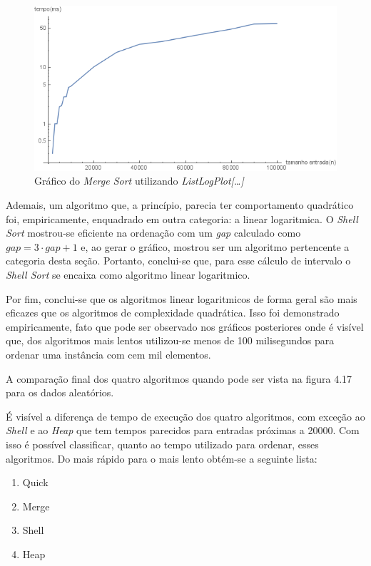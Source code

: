 \documentclass[a4paper, 12pt]{report}
\begin{document}
\begin{figure}[htb]
\centering
\includegraphics[width=.9\linewidth]{./img/merge_random.png}
\caption{Gráfico do \emph{Merge Sort} utilizando \emph{ListLogPlot[\ldots{}]}}
\end{figure}

Ademais, um algoritmo que, a princípio, parecia ter comportamento quadrático
foi, empiricamente, enquadrado em outra categoria: a linear logaritmica. O
\emph{Shell Sort} mostrou-se eficiente na ordenação com um \emph{gap} calculado como
$gap = 3 \cdot gap + 1$ e, ao gerar o gráfico, mostrou ser um algoritmo
pertencente a categoria desta seção. Portanto, conclui-se que, para esse
cálculo de intervalo o \emph{Shell Sort} se encaixa como algoritmo linear
logaritmico.

Por fim, conclui-se que os algoritmos linear logaritmicos de forma geral são
mais eficazes que os algoritmos de complexidade quadrática. Isso foi
demonstrado empiricamente, fato que pode ser observado nos gráficos
posteriores onde é visível que, dos algoritmos mais lentos utilizou-se menos
de 100 milisegundos para ordenar uma instância com cem mil elementos.

A comparação final dos quatro algoritmos quando pode ser vista na figura
4.17 para os dados aleatórios.

É visível a diferença de tempo de execução dos quatro algoritmos,
com exceção ao \emph{Shell} e ao \emph{Heap} que tem tempos parecidos para entradas
próximas a 20000. Com isso é possível classificar, quanto ao tempo utilizado
para ordenar, esses algoritmos. Do mais rápido para o mais lento obtém-se a
seguinte lista:

\begin{enumerate}
\item Quick
\item Merge
\item Shell
\item Heap
\end{enumerate}
\end{document}
